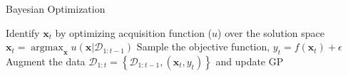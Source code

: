 \documentclass[10pt]{article}
\begin{document}
\begin{algorithm}
\caption{Bayesian Optimization}
\label{Bayes}
\begin{algorithmic}[1]
		\State Identify $\mathbf{x}_{t}$ by optimizing acquisition function ($u$) over the solution space $\mathbf{x}_{t}=\operatorname{argmax}_{\mathbf{x}} u\left(\mathbf{x} | \mathcal{D}_{1 : t-1}\right)$
		\State Sample the objective function, $y_t = f(\mathbf{x}_{t}) + \epsilon$ 
		\State Augment the data $\mathcal{D}_{1 : t}=\left\{\mathcal{D}_{1 : t-1},\left(\mathbf{x}_{t}, y_{t}\right)\right\}$ and update GP
	\EndFor
\end{algorithmic}
\end{algorithm}
\end{document}
